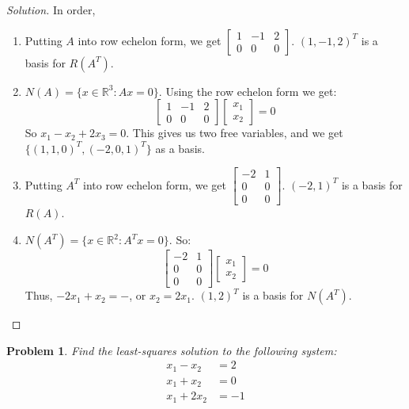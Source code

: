 \documentclass[oneside]{book}
\theoremstyle{mystyle}
\newtheorem{problem}{Problem}[section]
\begin{document}
\begin{proof}[Solution]
In order,
\begin{enumerate}
    \item Putting $A$ into row echelon form, we get $\begin{bmatrix} 1 & -1 & 2 \\ 0 & 0 & 0 \end{bmatrix}$. $(1,-1,2)^T$ is a basis for $R(A^{T})$.
    \item $N(A) = \{x\in \mathbb{R}^3: Ax = 0\}$. Using the row echelon form we get:
    \begin{equation*}
        \begin{bmatrix} 1 & -1 & 2 \\ 0 & 0 & 0 \end{bmatrix} \begin{bmatrix} x_1 \\ x_2 \end{bmatrix} = 0
    \end{equation*}
    So $x_1 - x_2 + 2x_3 = 0$. This gives us two free variables, and we get $\{(1,1,0)^{T},(-2,0,1)^{T}\}$ as a basis.
    \item Putting $A^T$ into row echelon form, we get $\begin{bmatrix} -2 & 1 \\ 0 & 0 \\ 0 & 0 \end{bmatrix}$. $(-2,1)^T$ is a basis for $R(A)$.
    \item $N(A^T) = \{x\in \mathbb{R}^2: A^T x = 0\}$. So:
    \begin{equation*}
        \begin{bmatrix} -2 & 1 \\ 0 & 0 \\ 0 & 0 \end{bmatrix} \begin{bmatrix} x_1 \\ x_2 \end{bmatrix} = 0    
    \end{equation*}
    Thus, $-2x_1 + x_2 = -$, or $x_2 = 2x_1$. $(1,2)^T$ is a basis for $N(A^{T})$.
\end{enumerate}
\end{proof}
\begin{problem}
Find the least-squares solution to the following system:
\begin{align*}
    x_1 - x_2 &=2\\
    x_1 + x_2 &= 0\\
    x_1 + 2x_2 &=-1
\end{align*}
\end{problem}
\end{document}
